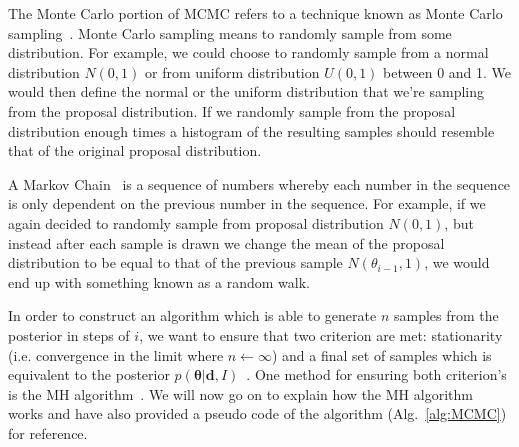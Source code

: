 The Monte Carlo portion of \ac{MCMC} 
refers to a technique known as Monte Carlo sampling~\cite{4736059}.
Monte Carlo sampling means to randomly sample from some distribution.
For example, we could choose to randomly sample from a normal 
distribution $N(0,1)$ or from uniform distribution $U(0,1)$ 
between 0 and 1. We would 
then define the normal or the uniform distribution that we're sampling 
from the proposal distribution. If we randomly sample from the 
proposal distribution enough times a histogram of the resulting 
samples should resemble that of the original proposal distribution. 

%
%
A Markov Chain~\cite{norris_1997} is a sequence of numbers
whereby each number in the sequence is only dependent on the 
previous number in the sequence. For example, if we again decided to 
randomly sample from proposal distribution $N(0,1)$, but instead 
after each sample is drawn we change the mean of the proposal distribution 
to be equal to that of the previous sample $N(\theta_{i-1},1)$, we 
would end up with something known as a random walk.

%
%
In order to construct an algorithm which is able to generate $n$ samples 
from the posterior in steps of $i$, we want to ensure 
that two criterion are met: stationarity (i.e. convergence in the limit 
where $n \leftarrow \infty$) and a final set of samples which is 
equivalent to the posterior 
$p(\bm{\theta}|\bm{d},I)$~\cite{2019arXiv190912313S}. One method for 
ensuring both criterion's is the 
\ac{MH} algorithm~\cite{doi:10.1063/1.1699114}. We will now go 
on to explain how the \ac{MH} algorithm works and have also provided 
a pseudo code of the algorithm (Alg.~\ref{alg:MCMC}) for reference.

